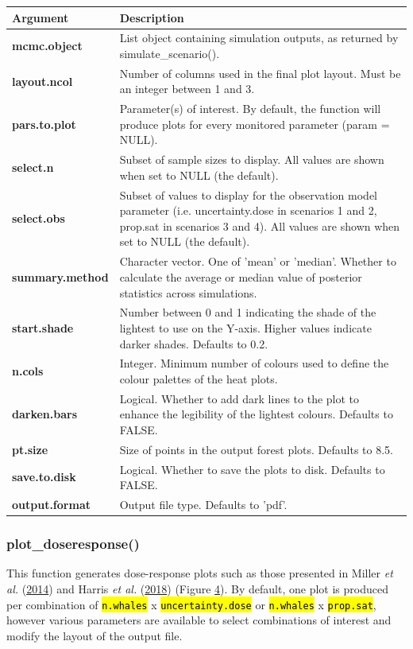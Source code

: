 \documentclass[
]{article}
\begin{document}
\renewcommand{\arraystretch}{1.4}

\begin{longtable}{>{\bfseries}l|>{\raggedright\arraybackslash}p{30em}}
\toprule
\textbf{Argument} & \textbf{Description}\\
\midrule
mcmc.object & List object containing simulation outputs, as returned by simulate\_scenario().\\
layout.ncol & Number of columns used in the final plot layout. Must be an integer between 1 and 3.\\
pars.to.plot & Parameter(s) of interest. By default, the function will produce plots for every monitored parameter (param = NULL).\\
select.n & Subset of sample sizes to display. All values are shown when set to NULL (the default).\\
select.obs & Subset of values to display for the observation model parameter (i.e. uncertainty.dose in scenarios 1 and 2, prop.sat in scenarios 3 and 4). All values are shown when set to NULL (the default).\\
\addlinespace
summary.method & Character vector. One of 'mean' or 'median'. Whether to calculate the average or median value of posterior statistics across simulations.\\
start.shade & Number between 0 and 1 indicating the shade of the lightest to use on the Y-axis. Higher values indicate darker shades. Defaults to 0.2.\\
n.cols & Integer. Minimum number of colours used to define the colour palettes of the heat plots.\\
darken.bars & Logical. Whether to add dark lines to the plot to enhance the legibility of the lightest colours. Defaults to FALSE.\\
pt.size & Size of points in the output forest plots. Defaults to 8.5.\\
\addlinespace
save.to.disk & Logical. Whether to save the plots to disk. Defaults to FALSE.\\
output.format & Output file type. Defaults to 'pdf'.\\
\bottomrule
\end{longtable}

\subsubsection{plot\_doseresponse()}

This function generates dose-response plots such as those presented in Miller \emph{et al.} (\protect\hyperlink{ref-Miller2014}{2014}) and Harris \emph{et al.} (\protect\hyperlink{ref-Harris2018}{2018}) (Figure \hyperlink{fig4}{4}). By default, one plot is produced per combination of \textcolor{codecolor}{\texttt{\hl{n.whales}}} x \textcolor{codecolor}{\texttt{\hl{uncertainty.dose}}} or \textcolor{codecolor}{\texttt{\hl{n.whales}}} x \textcolor{codecolor}{\texttt{\hl{prop.sat}}}, however various parameters are available to select combinations of interest and modify the layout of the output file.
\end{document}
